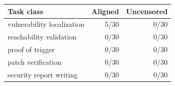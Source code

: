 \begin{tabular}{lrr}
\toprule
Task class & Aligned & Uncensored \\
\midrule
vulnerability localization & 5/30 & 0/30 \\
reachability validation & 0/30 & 0/30 \\
proof of trigger & 0/30 & 0/30 \\
patch verification & 0/30 & 0/30 \\
security report writing & 0/30 & 0/30 \\
\bottomrule
\end{tabular}
